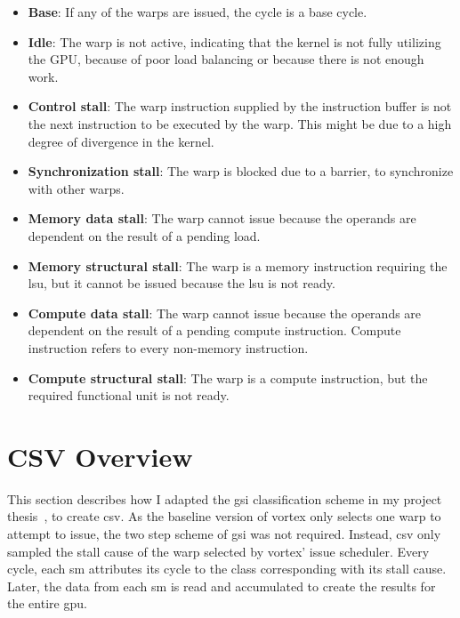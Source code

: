 \begin{itemize}
    \item \textbf{Base}: If any of the warps are issued, the cycle is a base cycle.
    \item \textbf{Idle}: The warp is not active, indicating that the kernel is not fully utilizing the GPU, because of poor load balancing or because there is not enough work.
    \item \textbf{Control stall}: The warp instruction supplied by the instruction buffer is not the next instruction to be executed by the warp. This might be due to a high degree of divergence in the kernel.
    \item \textbf{Synchronization stall}: The warp is blocked due to a barrier, to synchronize with other warps.
    \item \textbf{Memory data stall}: The warp cannot issue because the operands are dependent on the result of a pending load.
    \item \textbf{Memory structural stall}: The warp is a memory instruction requiring the \acrshort{lsu}, but it cannot be issued because the \acrshort{lsu} is not ready.
    \item \textbf{Compute data stall}: The warp cannot issue because the operands are dependent on the result of a pending compute instruction. Compute instruction refers to every non-memory instruction. 
    \item \textbf{Compute structural stall}: The warp is a compute instruction, but the required functional unit is not ready.
\end{itemize}


\section{CSV Overview} \label{sec:csv}

This section describes how I adapted the \acrshort{gsi} classification scheme in my project thesis~\cite{Aurud_Project}, to create \acrshort{csv}. As the baseline version of \Gls{vortex} only selects one warp to attempt to issue, the two step scheme of \acrshort{gsi} was not required. Instead, \acrshort{csv} only sampled the stall cause of the warp selected by \Gls{vortex}' issue scheduler. Every cycle, each \acrshort{sm} attributes its cycle to the class corresponding with its stall cause. Later, the data from each \acrshort{sm} is read and accumulated to create the results for the entire \acrshort{gpu}.

